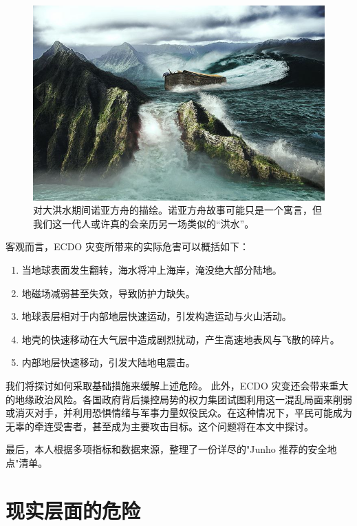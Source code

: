 \documentclass[10pt,twocolumn,letterpaper]{article}
\begin{document}
\begin{figure}[t]
\begin{center}
   \includegraphics[width=1\linewidth]{noah.jpg}
\end{center}
   \caption{对大洪水期间诺亚方舟的描绘。诺亚方舟故事可能只是一个寓言，但我们这一代人或许真的会亲历另一场类似的“洪水”。 \cite{2}}
\label{fig:1}
\label{fig:onecol}
\end{figure}

客观而言，ECDO 灾变所带来的实际危害可以概括如下：

\begin{flushleft}
\begin{enumerate}
    \item 当地球表面发生翻转，海水将冲上海岸，淹没绝大部分陆地。
    \item 地磁场减弱甚至失效，导致防护力缺失。
    \item 地球表层相对于内部地层快速运动，引发构造运动与火山活动。
    \item 地壳的快速移动在大气层中造成剧烈扰动，产生高速地表风与飞散的碎片。
    \item 内部地层快速移动，引发大陆地电震击。
\end{enumerate}
\end{flushleft}

我们将探讨如何采取基础措施来缓解上述危险。
此外，ECDO 灾变还会带来重大的地缘政治风险。各国政府背后操控局势的权力集团试图利用这一混乱局面来削弱或消灭对手，并利用恐惧情绪与军事力量奴役民众。在这种情况下，平民可能成为无辜的牵连受害者，甚至成为主要攻击目标。这个问题将在本文中探讨。

最后，本人根据多项指标和数据来源，整理了一份详尽的"Junho 推荐的安全地点"清单。
\section{现实层面的危险}
\end{document}
